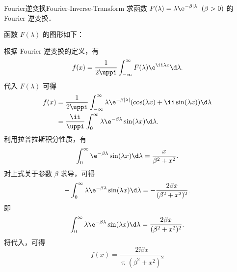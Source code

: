 \begin{problem}{Fourier逆变换}{Fourier-Inverse-Transform}
    求函数 $F(\lambda) = \lambda\e^{-\beta |\lambda|} \ (\beta > 0)$ 的 Fourier 逆变换．
\end{problem}

\begin{solution}
    函数 $F(\lambda)$ 的图形如下：
    \begin{center}
    \end{center}

    根据 Fourier 逆变换的定义，有
    \begin{equation}
        f(x) = \frac{1}{2\uppi} \int_{-\infty}^{\infty} F(\lambda) \e^{\ii\lambda x} \d\lambda.
    \end{equation}
    代入 $F(\lambda)$ 可得
    \begin{equation}\label{eq:inv-trans-def}
        \begin{aligned}
            f(x) & = \frac{1}{2\uppi} \int_{-\infty}^{\infty} \lambda \e^{-\beta|\lambda|} (\cos(\lambda x) + \ii \sin(\lambda x)) \d\lambda \\
                 & = \frac{\ii}{\uppi} \int_{0}^{\infty} \lambda \e^{-\beta\lambda} \sin(\lambda x) \d\lambda.
        \end{aligned}
    \end{equation}
    利用拉普拉斯积分性质，有
    \begin{equation}
        \int_0^\infty \e^{-\beta\lambda} \sin(\lambda x) \d\lambda = \frac{x}{\beta^2+x^2}.
    \end{equation}
    对上式关于参数 $\beta$ 求导，可得
    \begin{equation}
        -\int_0^\infty \lambda \e^{-\beta\lambda} \sin(\lambda x) \d\lambda = -\frac{2\beta x}{(\beta^2+x^2)^2}.
    \end{equation}
    即
    \begin{equation}\label{eq:int-formula-sin}
        \int_0^\infty \lambda \e^{-\beta\lambda} \sin(\lambda x) \d\lambda = \frac{2\beta x}{(\beta^2+x^2)^2}.
    \end{equation}
    将代入，可得
    \begin{equation}
        \boxed{f(x) = \frac{2\ii\beta x}{\uppi(\beta^2 + x^2)^2}}
    \end{equation}
\end{solution}

\endinput
